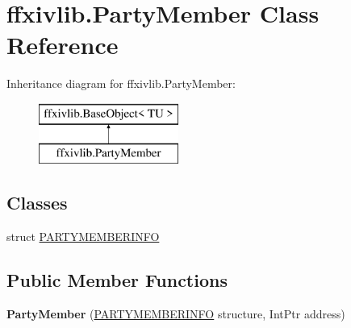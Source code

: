 \hypertarget{classffxivlib_1_1_party_member}{\section{ffxivlib.\-Party\-Member Class Reference}
\label{classffxivlib_1_1_party_member}
}
Inheritance diagram for ffxivlib.\-Party\-Member\-:\begin{figure}[H]
\begin{center}
\leavevmode
\includegraphics[height=2.000000cm]{classffxivlib_1_1_party_member}
\end{center}
\end{figure}
\subsection*{Classes}
\begin{DoxyCompactItemize}
\item 
struct \hyperlink{structffxivlib_1_1_party_member_1_1_p_a_r_t_y_m_e_m_b_e_r_i_n_f_o}{P\-A\-R\-T\-Y\-M\-E\-M\-B\-E\-R\-I\-N\-F\-O}
\end{DoxyCompactItemize}
\subsection*{Public Member Functions}
\begin{DoxyCompactItemize}
\item 
\hypertarget{classffxivlib_1_1_party_member_a2ff972ec625974fc90a8af7e577c96d2}{{\bfseries Party\-Member} (\hyperlink{structffxivlib_1_1_party_member_1_1_p_a_r_t_y_m_e_m_b_e_r_i_n_f_o}{P\-A\-R\-T\-Y\-M\-E\-M\-B\-E\-R\-I\-N\-F\-O} structure, Int\-Ptr address)}\label{classffxivlib_1_1_party_member_a2ff972ec625974fc90a8af7e577c96d2}

\end{DoxyCompactItemize}

